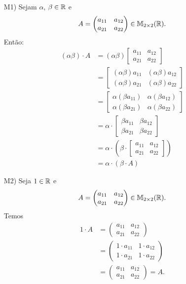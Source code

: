 \documentclass[12pt]{exam}
\begin{document}
\begin{itemize}
        \item[M1)] Sejam $\alpha$, $\beta \in \mathbb{R}$ e
        \[
        A = \begin{pmatrix} a_{11} & a_{12}\\a_{21} & a_{22}\end{pmatrix} \in \mathbb{M}_{2 \times 2}(\mathbb{R}).
        \]
        Então:
        \begin{align*}
            (\alpha\beta)\cdot A & = (\alpha\beta)\begin{bmatrix} a_{11} & a_{12}\\a_{21} & a_{22}\end{bmatrix}
            \\ &= \begin{bmatrix} (\alpha\beta)a_{11} & (\alpha\beta)a_{12}\\(\alpha\beta)a_{21} & (\alpha\beta)a_{22}\end{bmatrix}
            \\ &= \begin{bmatrix} \alpha(\beta a_{11}) & \alpha(\beta a_{12})\\\alpha(\beta a_{21}) & \alpha(\beta a_{22})\end{bmatrix}
            \\ &= \alpha\cdot\begin{bmatrix} \beta a_{11} & \beta a_{12}\\\beta a_{21} & \beta a_{22}\end{bmatrix}
            \\ &= \alpha\cdot\left(\beta\cdot\begin{bmatrix} a_{11} & a_{12}\\a_{21} & a_{22}\end{bmatrix}\right)
            \\ &= \alpha\cdot(\beta\cdot A)
        \end{align*}

        \item[M2)] Seja $1 \in \mathbb{R}$ e
        \[
        A = \begin{pmatrix} a_{11} & a_{12}\\a_{21} & a_{22}\end{pmatrix} \in \mathbb{M}_{2 \times 2}(\mathbb{R}).
        \]
        Temos
        \begin{align*}
            1\cdot A & = \begin{pmatrix} a_{11} & a_{12}\\a_{21} & a_{22}\end{pmatrix}
            \\ &= \begin{pmatrix} 1\cdot a_{11} & 1\cdot a_{12}\\1\cdot a_{21} & 1\cdot a_{22}\end{pmatrix}
            \\ &= \begin{pmatrix} a_{11} & a_{12}\\a_{21} & a_{22}\end{pmatrix} = A.
        \end{align*}


\end{itemize}
\end{document}
